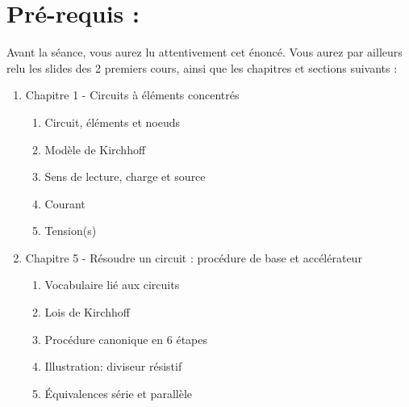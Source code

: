 \section*{Pré-requis :}
%
Avant la séance, vous aurez lu attentivement cet énoncé. Vous aurez par ailleurs relu les slides des 2 premiers cours, ainsi que les chapitres et sections suivants :
\begin{enumerate}
\item Chapitre 1 - Circuits à éléments concentrés
	\begin{enumerate}
    \item Circuit, éléments et noeuds
    \item Modèle de Kirchhoff
    \item Sens de lecture, charge et source
    \item Courant
    \item Tension(s)
    \end{enumerate}

\item Chapitre 5 - Résoudre un circuit : procédure de base et accélérateur
	\begin{enumerate}
    \item Vocabulaire lié aux circuits
	\item Lois de Kirchhoff
    \item Procédure canonique en 6 étapes
    \item Illustration: diviseur résistif
    \item Équivalences série et parallèle
    \end{enumerate}
\end{enumerate}


